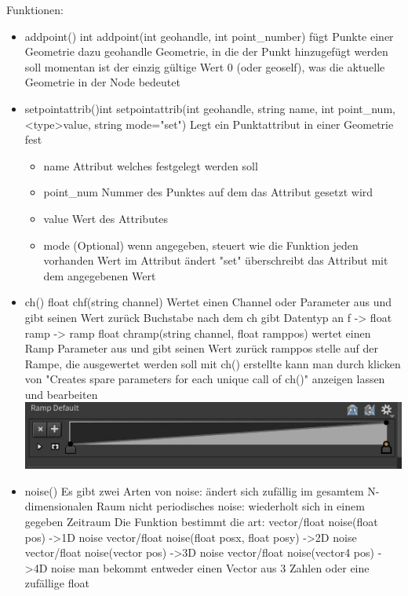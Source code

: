 Funktionen:
\begin{itemize}
\item addpoint()	int  addpoint(int geohandle, int point_number)
fügt Punkte einer Geometrie dazu
geohandle 	Geometrie, in die der Punkt hinzugefügt werden soll
		momentan ist der einzig gültige Wert 0 (oder geoself), was die aktuelle Geometrie in der Node bedeutet
\item setpointattrib()int  	setpointattrib(int geohandle, string name, int point_num, <type>value, string mode="set")
Legt ein Punktattribut in einer Geometrie fest
	\begin{itemize}
	\item name 		Attribut welches festgelegt werden soll
	\item point_num 	Nummer des Punktes auf dem das Attribut gesetzt wird
	\item value 		Wert des Attributes
	\item mode 		(Optional)
			wenn angegeben, steuert wie die Funktion jeden vorhanden Wert im Attribut ändert 
			"set" überschreibt das Attribut mit dem angegebenen Wert	 	
	\end{itemize}						
					
\item ch() 	float  chf(string channel)
		Wertet einen Channel oder Parameter aus und gibt seinen Wert zurück
		Buchstabe nach dem ch gibt Datentyp an 
		f -> float
		ramp -> ramp
 		float  	chramp(string channel, float ramppos)
			wertet einen Ramp Parameter aus und gibt seinen Wert zurück	
			ramppos 	stelle auf der Rampe, die ausgewertet werden soll
		mit ch() erstellte kann man durch klicken von "Creates spare parameters for each unique call of ch()" anzeigen lassen und bearbeiten
		\includegraphics*[width=\textwidth]{graphics/attribVOPramp.JPG}
		
\item noise()		Es gibt zwei Arten von noise: ändert sich zufällig im gesamtem N-dimensionalen Raum
			nicht periodisches noise: wiederholt sich in einem gegeben Zeitraum
			Die Funktion bestimmt die art:
			vector/float noise(float pos) ->1D noise	
			vector/float noise(float posx, float posy) ->2D noise
			vector/float noise(vector pos) ->3D noise
			vector/float noise(vector4 pos) ->4D noise
			man bekommt entweder einen Vector aus 3 Zahlen oder eine zufällige float
\end{itemize}

